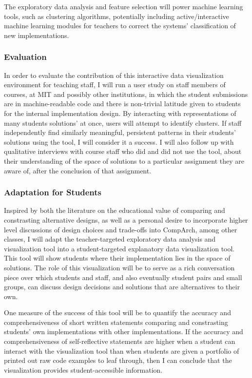 \documentclass[12pt]{article}
\begin{document}
The exploratory data analysis and feature selection will power machine learning tools, such as clustering algorithms, potentially including active/interactive machine learning modules for teachers to correct the systems' classification of new implementations. 

\subsubsection{Evaluation}

In order to evaluate the contribution of this interactive data visualization environment for teaching staff, I will run a user study on staff members of courses, at MIT and possibly other institutions, in which the student submissions are in machine-readable code and there is non-trivial latitude given to students for the internal implementation design. By interacting with representations of many students solutions' at once, users will attempt to identify clusters. If staff independently find similarly meaningful, persistent patterns in their students' solutions using the tool, I will consider it a success. I will also follow up with qualitative interviews with course staff who did and did not use the tool, about their understanding of the space of solutions to a particular assignment they are aware of, after the conclusion of that assignment.

\subsubsection{Adaptation for Students}

Inspired by both the literature on the educational value of comparing and constrasting alternative designs, as well as a personal desire to incorporate higher level discussions of design choices and trade-offs into CompArch, among other classes, I will adapt the teacher-targeted exploratory data analysis and visualization tool into a student-targeted explanatory data visualization tool. This tool will show students where their implementation lies in the space of solutions. The role of this visualization will be to serve as a rich conversation piece over which students and staff, and also eventually student pairs and small groups, can discuss design decisions and solutions that are alternatives to their own. 

One measure of the success of this tool will be to quantify the accuracy and comprehensiveness of short written statements comparing and constrasting students' own implementations with other implementations. If the accuracy and comprehensiveness of self-reflective statements are higher when a student can interact with the visualization tool than when students are given a portfolio of printed out raw code examples to leaf through, then I can conclude that the visualization provides student-accessible information.
\end{document}
